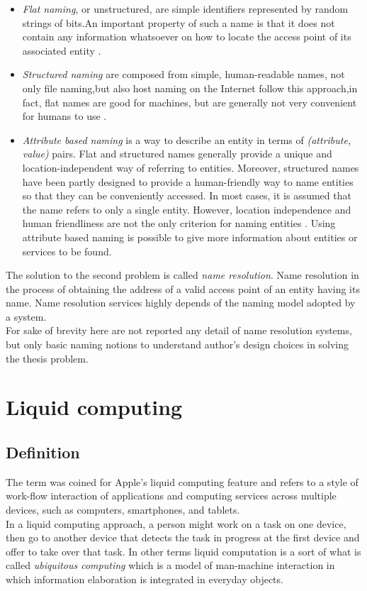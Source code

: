 \begin{itemize}
	\item \textit{Flat naming}, or unstructured, are simple identifiers represented by random strings of bits.An important property of such a name is that it does not contain any information whatsoever on how to locate the	access point of its associated entity \cite{tanenbaum2010distributed}.
	\item \textit{Structured naming} are composed from simple, human-readable names, not only file naming,but also host naming on the Internet follow this approach,in fact, flat names are good for machines, but are generally not very convenient for humans to use \cite{tanenbaum2010distributed}.
	\item \textit{Attribute based naming} is a way to describe an entity in terms of \textit{(attribute, value)}
	pairs. Flat and structured names generally provide a unique and location-independent
	way of referring to entities. Moreover, structured names have been partly
	designed to provide a human-friendly way to name entities so that they can be
	conveniently accessed. In most cases, it is assumed that the name refers to only a
	single entity. However, location independence and human friendliness are not the
	only criterion for naming entities \cite{tanenbaum2010distributed}. Using attribute based naming is possible to give more information about entities or services to be found.
\end{itemize}
The solution to the second problem is called \textit{name resolution}. Name resolution in the process of obtaining the address of a valid access point of an entity having its name. Name resolution services highly depends of the naming model adopted by a system.\\
For sake of brevity here are not reported any detail of name resolution systems, but only basic naming notions to understand author's design choices in solving the thesis problem. 


\section{Liquid computing}\label{liquid computing}
\subsection{Definition}
The term was coined for Apple's liquid computing feature and  refers to a style of work-flow interaction of applications and computing services across multiple devices, such as computers, smartphones, and tablets.\\
In a liquid computing approach, a person might work on a task on one device, then go to another device that detects the task in progress at the first device and offer to take over that task.
In other terms liquid computation is a sort of what is called \textit{ubiquitous computing} which is a model of man-machine interaction in which information elaboration is integrated in everyday objects.
